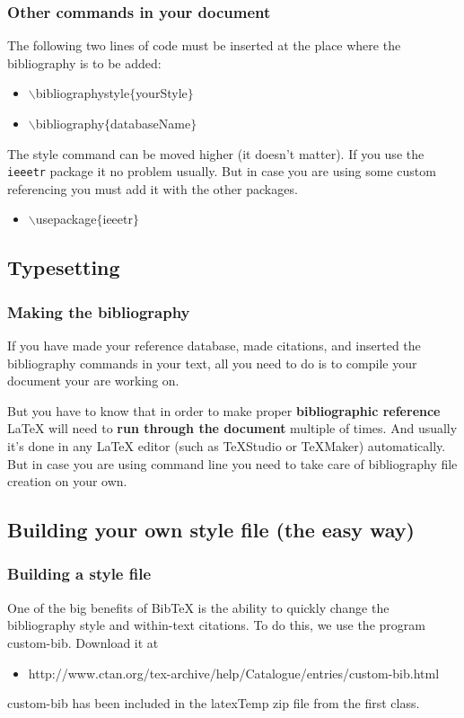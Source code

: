 \begin{frame}  \frametitle{Other commands in your document}
	The following two lines of code must be inserted at the place where the bibliography is to be added:
	\begin{itemize}
		\item[] {\color{command}$\backslash$bibliographystyle\color{braces}$\{${\color{black}yourStyle}$\}$}
		\item[] {\color{command}$\backslash$bibliography\color{braces}$\{${\color{black}databaseName}$\}$}
	\end{itemize}
	The style command can be moved higher (it doesn't matter). If you use the \texttt{\color{highlight}ieeetr} package it no problem usually. But in case you are using some custom referencing you must add it with the other packages.
	\begin{itemize}
		\item[] {\color{command}$\backslash$usepackage\color{braces}$\{${\color{black}ieeetr}$\}$}
	\end{itemize}
\end{frame}

\subsection{Typesetting}

\begin{frame}  \frametitle{Making the bibliography}
	
	If you have made your reference database, made citations, and inserted the bibliography commands in your text, all you need to do is to compile your document your are working on. 
	
	\vspace{0.5cm}
	
	But you have to know that in order to make proper \textbf{bibliographic reference} LaTeX will need to \textbf{run through the document} multiple of times. And usually it's done in any LaTeX editor  (such as TeXStudio or TeXMaker) automatically. But in case you are using command line you need to take care of bibliography file creation on your own.
	
\end{frame}

\subsection{Building your own style file (the easy way)}

\begin{frame}  \frametitle{Building a style file}
	One of the big benefits of BibTeX is the ability to quickly change the bibliography style and within-text citations. To do this, we use the program {\color{highlight}custom-bib}. Download it at
	\begin{itemize}\small 
		\item[] \color{highlight} http://www.ctan.org/tex-archive/help/Catalogue/entries/custom-bib.html
	\end{itemize}
	custom-bib has been included in the {\color{highlight}latexTemp} zip file from the first class.
\end{frame}

